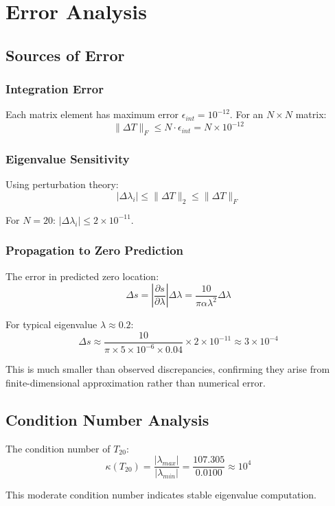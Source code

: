 \documentclass[12pt,letterpaper]{article}
\theoremstyle{plain}
\theoremstyle{definition}
\theoremstyle{remark}
\newcommand{\norm}[1]{\|#1\|}
\begin{document}
\section{Error Analysis}

\subsection{Sources of Error}

\subsubsection{Integration Error}
Each matrix element has maximum error $\epsilon_{int} = 10^{-12}$. For an $N \times N$ matrix:
\begin{equation}
\norm{\Delta T}_F \leq N \cdot \epsilon_{int} = N \times 10^{-12}
\end{equation}

\subsubsection{Eigenvalue Sensitivity}
Using perturbation theory:
\begin{equation}
|\Delta \lambda_i| \leq \norm{\Delta T}_2 \leq \norm{\Delta T}_F
\end{equation}

For $N = 20$: $|\Delta \lambda_i| \leq 2 \times 10^{-11}$.

\subsubsection{Propagation to Zero Prediction}
The error in predicted zero location:
\begin{equation}
\Delta s = \left|\frac{\partial s}{\partial \lambda}\right| \Delta \lambda = \frac{10}{\pi \alpha \lambda^2} \Delta \lambda
\end{equation}

For typical eigenvalue $\lambda \approx 0.2$:
\begin{equation}
\Delta s \approx \frac{10}{\pi \times 5 \times 10^{-6} \times 0.04} \times 2 \times 10^{-11} \approx 3 \times 10^{-4}
\end{equation}

This is much smaller than observed discrepancies, confirming they arise from finite-dimensional approximation rather than numerical error.

\subsection{Condition Number Analysis}

The condition number of $T_{20}$:
\begin{equation}
\kappa(T_{20}) = \frac{|\lambda_{max}|}{|\lambda_{min}|} = \frac{107.305}{0.0100} \approx 10^4
\end{equation}

This moderate condition number indicates stable eigenvalue computation.
\end{document}
